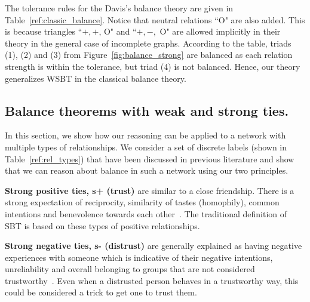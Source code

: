 \documentclass[acmtweb]{acmsmall}
\begin{document}
The tolerance rules for the Davis's balance theory are given in
Table~\ref{ref:classic_balance}. Notice that neutral relations ``O"
are also added. This is because triangles ``$+, +$, O" and ``$+, -,$
O" are allowed implicitly in their theory in the general case of
incomplete graphs. According to the table, triads (1), (2) and (3)
from Figure~\ref{fig:balance_strong} are balanced as each relation
strength is within the tolerance, but triad (4) is not
balanced. Hence, our theory generalizes WSBT in the classical balance
theory.

\subsection{Balance theorems with weak and strong ties.} \label{sec:weak_strong}
In this section, we show how our reasoning can be applied to a network
with multiple types of relationships. We consider a set of discrete
labels (shown in Table~\ref{ref:rel_types}) that have been discussed
in previous literature and show that we can reason about balance in
such a network using our two principles. 

{\bf Strong positive ties, s+ (trust)} are similar to a close
friendship. There is a strong expectation of reciprocity, similarity
of tastes (homophily), common intentions and benevolence towards each
other~\cite{Tomasello:2005}. The traditional definition of SBT is
based on these types of positive relationships.

{\bf Strong negative ties, s- (distrust)} are generally explained as
having negative experiences with someone which is indicative of their
negative intentions, unreliability and overall belonging to groups
that are not considered trustworthy~\cite{Fiske:2007}. Even when a
distrusted person behaves in a trustworthy way, this could be
considered a trick to get one to trust them.

\begin{table} [htbp!]
\end{table}
\end{document}
